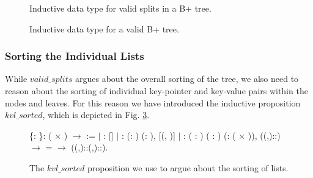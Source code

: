 \begin{figure}

\caption{Inductive data type for valid splits in a B+ tree.}
\label{fig:inductive_valid_splits}
\end{figure}

\begin{figure}
\centering

\caption{Inductive data type for a valid B+ tree.}
\label{fig:inductive_valid_bplustree}
\end{figure}

\subsubsection{Sorting the Individual Lists}
\label{sec:Kvl_sorted}
While $valid\_splits$ argues about the overall sorting of the tree, we also need to reason about the sorting of individual key-pointer and key-value pairs within the nodes and leaves. For this reason we have introduced the inductive proposition $kvl\_sorted$, which is depicted in Fig. \ref{fig:kvl_sorted}.

\begin{figure}
  \begin{coqdoccode}
  \coqdocnoindent
    \{: \}:  ( \ensuremath{\times} ) \ensuremath{\rightarrow}  :=\coqdoceol
  \coqdocindent{1.00em}
  \ensuremath{|}
  :  []\coqdoceol
  \coqdocindent{1.00em}
  \ensuremath{|} : \coqdockw{\ensuremath{\forall}} (: ) (: ), \coqdoceol
  \coqdocindent{8.00em}
   [(, )]\coqdoceol
  \coqdocindent{1.00em}
  \ensuremath{|} : \coqdockw{\ensuremath{\forall}} ( : ) ( : ) (:  ( \ensuremath{\times} )), \coqdoceol
  \coqdocindent{8.00em}
   ((,)::) \ensuremath{\rightarrow} \coqdoceol
  \coqdocindent{8.00em}
     =  \ensuremath{\rightarrow}\coqdoceol
  \coqdocindent{8.00em}
   ((,)::(,)::).\coqdoceol
  \end{coqdoccode}
  \caption{The $kvl\_sorted$ proposition we use to argue about the sorting of lists.}
  \label{fig:kvl_sorted}
\end{figure}

